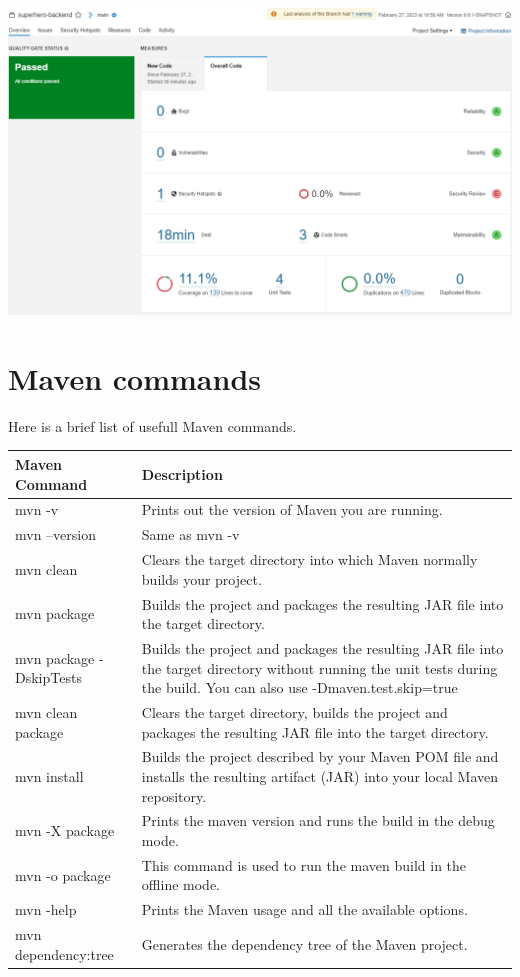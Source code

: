 \includegraphics[width=\textwidth]{./images/chapter3/sonarqube-report.png}

\section{Maven commands}

Here is a brief list of usefull Maven commands.

\begin{tabularx}{\textwidth}{ |l|X| } 
\hline
\textbf{Maven Command}	& \textbf{Description} \\
\hline
mvn -v	& Prints out the version of Maven you are running.\\ 
mvn --version & Same as mvn -v\\
mvn clean	& Clears the target directory into which Maven normally builds your project.\\
mvn package & Builds the project and packages the resulting JAR file into the target directory.\\
mvn package -DskipTests &	Builds the project and packages the resulting JAR file into the target directory without running the unit tests during the build. You can also use -Dmaven.test.skip=true\\
mvn clean package &	Clears the target directory,  builds the project and packages the resulting JAR file into the target directory.\\
mvn install & Builds the project described by your Maven POM file and installs the resulting artifact (JAR) into your local Maven repository.\\
mvn -X package & Prints the maven version and runs the build in the debug mode. \\
mvn -o package & This command is used to run the maven build in the offline mode.\\
mvn -help & Prints the Maven usage and all the available options.\\
mvn dependency:tree & Generates the dependency tree of the Maven project.\\
\hline
\end{tabularx}

